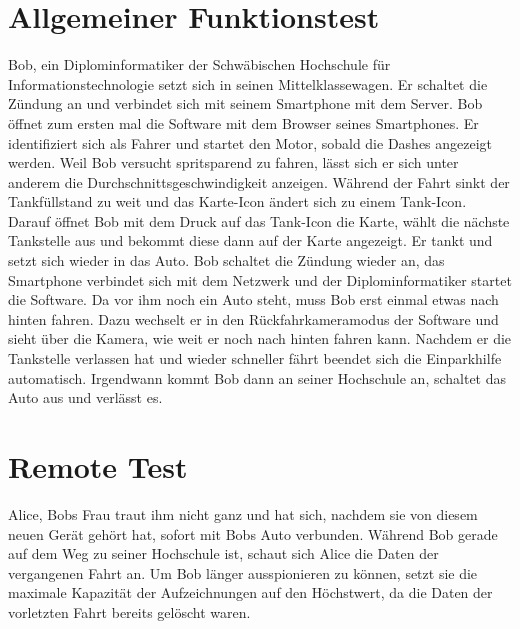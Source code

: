 \documentclass[pflichtenheft.tex]{subfiles}
\begin{document}
\section{Allgemeiner Funktionstest}
Bob, ein Diplominformatiker der Schwäbischen Hochschule für Informationstechnologie setzt sich in seinen Mittelklassewagen. Er schaltet die Zündung an und verbindet sich mit seinem Smartphone mit dem Server. Bob öffnet  zum ersten mal die Software mit dem Browser seines Smartphones. Er identifiziert sich als Fahrer und startet den Motor, sobald die Dashes angezeigt werden. Weil Bob versucht spritsparend zu fahren, lässt sich er sich unter anderem die Durchschnittsgeschwindigkeit anzeigen. Während der Fahrt sinkt der Tankfüllstand zu weit und das Karte-Icon ändert sich zu einem Tank-Icon. Darauf öffnet Bob mit dem Druck auf das Tank-Icon die Karte, wählt die nächste Tankstelle aus und bekommt diese dann auf der Karte angezeigt. Er tankt und setzt sich wieder in das Auto. Bob schaltet die Zündung wieder an, das Smartphone verbindet sich mit dem Netzwerk und der Diplominformatiker startet die Software. Da vor ihm noch ein Auto steht, muss Bob erst einmal etwas nach hinten fahren. Dazu wechselt er in den Rückfahrkameramodus der Software und sieht über die Kamera, wie weit er noch nach hinten fahren kann. Nachdem er die Tankstelle verlassen hat und wieder schneller fährt beendet sich die Einparkhilfe automatisch. Irgendwann kommt Bob dann an seiner Hochschule an, schaltet das Auto aus und verlässt es.

\section{Remote Test}
Alice, Bobs Frau traut ihm nicht ganz und hat sich, nachdem sie von diesem neuen Gerät gehört hat, sofort mit Bobs Auto verbunden. Während Bob gerade auf dem Weg zu seiner Hochschule ist, schaut sich Alice die Daten der vergangenen Fahrt an. Um Bob länger ausspionieren zu können, setzt sie die maximale Kapazität der Aufzeichnungen auf den Höchstwert, da die Daten der vorletzten Fahrt bereits gelöscht waren.
\end{document}
